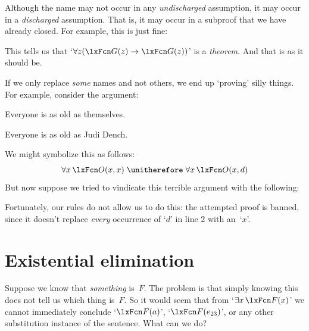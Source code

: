 Although the name may not occur in any \emph{undischarged} assumption, it may occur in a \emph{discharged} assumption. That is, it may occur in a subproof that we have already closed. For example, this is just fine:
\begin{fitchproof}
	\open
		\AS
	\close
\end{fitchproof}
This tells us that `$\forall z (\atom{G}{z} \eif \atom{G}{z})$' is a \emph{theorem}. And that is as it should be.

If we only replace \emph{some} names and not others, we end up
`proving' silly things. For example, consider the argument:
	\begin{earg}
	\item Everyone is as old as themselves.
	\item[\texttherefore] Everyone is as old as Judi Dench.
	\end{earg}
We might symbolize this as follows:
$$\forall x\,\atom{O}{x,x} \therefore \forall x\,\atom{O}{x,d}$$
But now suppose we tried to vindicate this terrible argument with the following:
\begin{fitchproof}
	\PR
\end{fitchproof}
Fortunately, our rules do not allow us to do this: the attempted proof
is banned, since it doesn't replace \emph{every} occurrence of `$d$'
in line 2 with an~`$x$'.

\section{Existential elimination}\label{s:existsElim}

Suppose we know that \emph{something} is~$F$. The problem is that simply knowing this does not tell us which thing is~$F$. So it would seem that from `$\exists x\,\atom{F}{x}$' we cannot immediately conclude `$\atom{F}{a}$', `$\atom{F}{e_{23}}$', or any other substitution instance of the sentence. What can we do?

